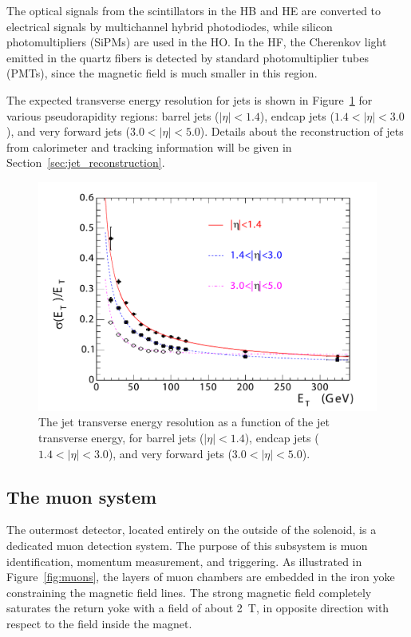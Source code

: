 The optical signals from the scintillators in the HB and HE are converted to electrical signals by multichannel hybrid photodiodes, while silicon photomultipliers (SiPMs) are used in the HO. In the HF, the Cherenkov light emitted in the quartz fibers is detected by standard photomultiplier tubes (PMTs), since the magnetic field is much smaller in this region.

The expected transverse energy resolution for jets is shown in Figure~\ref{fig:JER} for various pseudorapidity regions: barrel jets ($|\eta| < 1.4$), endcap jets ($1.4 < |\eta| < 3.0$), and very forward jets ($3.0 < |\eta| < 5.0$). Details about the reconstruction of jets from calorimeter and tracking information will be given in Section~\ref{sec:jet_reconstruction}.

\begin{figure}[ht]
  \centering
 \includegraphics[width=.6\textwidth]{JER}
 \caption{The jet transverse energy resolution as a function of the jet transverse energy, for barrel jets ($|\eta| < 1.4$), endcap jets ($1.4 < |\eta| < 3.0$), and very forward jets ($3.0 < |\eta| < 5.0$).}
 \label{fig:JER}
\end{figure}

\subsection{The muon system}

The outermost detector, located entirely on the outside of the solenoid, is a dedicated muon detection system. The purpose of this subsystem is muon identification, momentum measurement, and triggering. As illustrated in Figure~\ref{fig:muons}, the layers of muon chambers are embedded in the iron yoke constraining the magnetic field lines. The strong magnetic field completely saturates the return yoke with a field of about \SI{2}{T}, in opposite direction with respect to the field inside the magnet.

